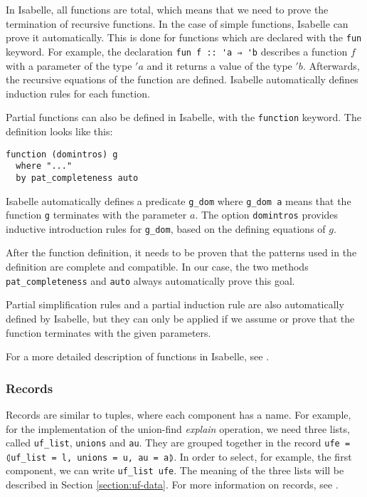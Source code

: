 In Isabelle, all functions are total, which means that we need to prove the termination of recursive functions.
In the case of simple functions, Isabelle can prove it automatically.
This is done for functions which are declared with the \lstinline{fun} keyword.
For example, the declaration \lstinline|fun f :: 'a ⇒ 'b| describes a function $f$ with a parameter of the type $'a$ and it returns a value of the type $'b$.
Afterwards, the recursive equations of the function are defined.
Isabelle automatically defines induction rules for each function.

Partial functions can also be defined in Isabelle, with the \lstinline{function} keyword.
The definition looks like this:

\begin{lstlisting}
function (domintros) g
  where "..."
  by pat_completeness auto
\end{lstlisting}

Isabelle automatically defines a predicate \lstinline|g_dom| where \lstinline{g_dom a} means that the function \lstinline|g| terminates with the parameter $a$.
The option \lstinline{domintros} provides inductive introduction rules for \lstinline|g_dom|, based on the defining equations of $g$.

After the function definition, it needs to be proven that the patterns used in the definition are complete and compatible. In our case, the two methods \lstinline|pat_completeness| and \lstinline|auto| always automatically prove this goal.

Partial simplification rules and a partial induction rule are also automatically defined by Isabelle, but they can only be applied if we assume or prove that the function terminates with the given parameters.

For a more detailed description of functions in Isabelle, see \cite{functions}.

\subsubsection{Records}

Records are similar to tuples, where each component has a name. For example, for the implementation of the union-find \emph{explain} operation, we need three lists, called \lstinline|uf_list|, \lstinline|unions| and \lstinline|au|.
They are grouped together in the record \lstinline{ufe = ⦇uf_list = l, unions = u, au = a⦈}. In order to select, for example, the first component, we can write \lstinline{uf_list ufe}. The meaning of the three lists will be described in Section \ref{section:uf-data}.
For more information on records, see \cite[chapter 8.3]{isabelle}.

